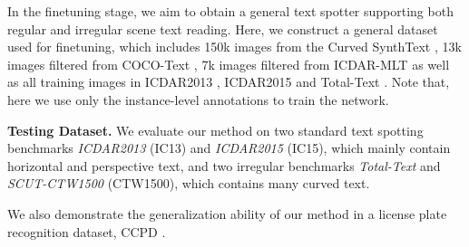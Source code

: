 \documentclass[letterpaper]{article} \usepackage{aaai21}  \usepackage{times}  \usepackage{helvet} \usepackage{courier}  \usepackage[hyphens]{url}  \usepackage{graphicx} \urlstyle{rm} \def\UrlFont{\rm}  \usepackage{natbib}  \usepackage{caption} \frenchspacing  \setlength{\pdfpagewidth}{8.5in}  \setlength{\pdfpageheight}{11in}  \usepackage{multirow}
\begin{document}
In the finetuning stage, we aim to obtain a general text spotter supporting both regular and irregular scene text reading. Here, we construct a general dataset used for finetuning, which includes 150k images from the Curved SynthText \cite{liu2020abcnet}, 13k images filtered from COCO-Text \cite{2016COCO}, 7k images filtered from ICDAR-MLT \cite{2019ICDAR2019} as well as all training images in ICDAR2013 \cite{karatzas2013icdar}, ICDAR2015 \cite{karatzas2015icdar} and Total-Text \cite{ch2017total}.
Note that, here we use only the instance-level annotations to train the network.

\textbf{Testing Dataset.}
We evaluate our method on two standard text spotting benchmarks \emph{ICDAR2013} \cite{karatzas2013icdar} (IC13)  and \emph{ICDAR2015} \cite{karatzas2015icdar} (IC15), which mainly contain horizontal and perspective text, and two irregular benchmarks \emph{Total-Text} \cite{ch2017total} and \emph{SCUT-CTW1500} \cite{liu2019curved} (CTW1500), which contains many curved text.

We also demonstrate the generalization ability of our method in a license plate recognition dataset, CCPD \cite{xu2018towards}.
\end{document}
